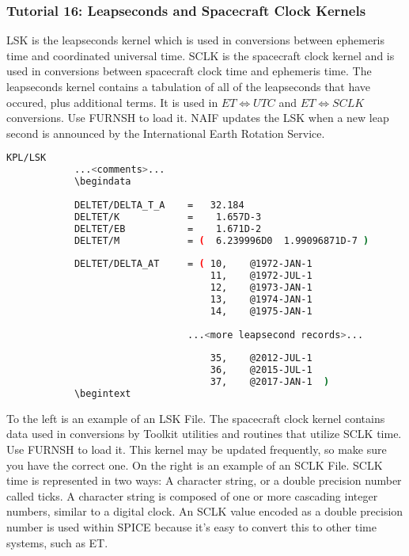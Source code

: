 \documentclass[crop=false,class=article,oneside]{standalone}
\begin{document}
            \subsubsection{Tutorial 16: Leapseconds and Spacecraft Clock Kernels}
            LSK is the leapseconds kernel which is used in conversions between ephemeris time and coordinated universal time. SCLK is the spacecraft clock kernel and is used in conversions between spacecraft clock time and ephemeris time. The leapseconds kernel contains a tabulation of all of the leapseconds that have occured, plus additional terms. It is used in $ET\Leftrightarrow UTC$ and $ET\Leftrightarrow SCLK$ conversions. Use FURNSH to load it. NAIF updates the LSK when a new leap second is announced by the International Earth Rotation Service.
            \begin{lstlisting}[language=bash,basicstyle=\footnotesize]
            KPL/LSK
            ...<comments>...
            \begindata
            
            DELTET/DELTA_T_A    =   32.184
            DELTET/K            =    1.657D-3
            DELTET/EB           =    1.671D-2
            DELTET/M            = (  6.239996D0  1.99096871D-7 )
            
            DELTET/DELTA_AT     = ( 10,    @1972-JAN-1
                                    11,    @1972-JUL-1
                                    12,    @1973-JAN-1
                                    13,    @1974-JAN-1
                                    14,    @1975-JAN-1
            
                                ...<more leapsecond records>...
            
                                    35,    @2012-JUL-1
                                    36,    @2015-JUL-1
                                    37,    @2017-JAN-1  )
            \begintext
            \end{lstlisting}
            To the left is an example of an LSK File. The spacecraft clock kernel contains data used in conversions by Toolkit utilities and routines that utilize SCLK time. Use FURNSH to load it. This kernel may be updated frequently, so make sure you have the correct one. On the right is an example of an SCLK File. SCLK time is represented in two ways: A character string, or a double precision number called ticks. A character string is composed of one or more cascading integer numbers, similar to a digital clock. An SCLK value encoded as a double precision number is used within SPICE because it's easy to convert this to other time systems, such as ET.
\end{document}
